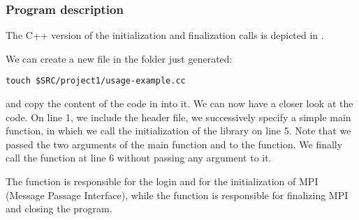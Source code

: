 \subsubsection*{Program description}
The C++ version of the \Atlas initialization and finalization
calls is depicted in .
%

%
We can create a new file in the folder  just generated:
%
\begin{lstlisting}[style=BashStyle]
touch $SRC/project1/usage-example.cc
\end{lstlisting}
%
and copy the content of the code in  into it.
We can now have a closer look at the code.
On line 1, we include the \Atlas header file, we successively 
specify a simple main function, in which we call the initialization 
of the \Atlas library on line 5.
Note that we passed the two arguments of the main function 
 and  to the  
function.
We finally call the \Atlas {} function 
at line 6 without passing any argument to it.

The function  is responsible for 
the login and for the initialization of MPI (Message Passage 
Interface), while the function  
is responsible for finalizing MPI and closing the program.

